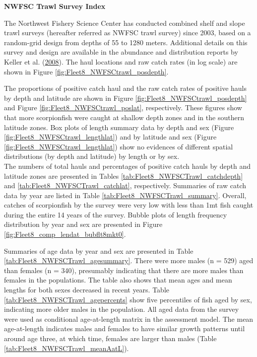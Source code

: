 \documentclass[12pt,]{article}
\begin{document}
\textbf{NWFSC Trawl Survey Index}

The Northwest Fishery Science Center has conducted combined shelf and
slope trawl surveys (hereafter referred as NWFSC trawl survey) since
2003, based on a random-grid design from depths of 55 to 1280 meters.
Additional details on this survey and design are available in the
abundance and distribution reports by Keller et al.
(\protect\hyperlink{ref-Keller2008}{2008}). The haul locations and raw
catch rates (in log scale) are shown in Figure
\ref{fig:Fleet8_NWFSCtrawl_posdepth}.

The proportions of positive catch haul and the raw catch rates of
positive hauls by depth and latitude are shown in Figure
\ref{fig:Fleet8_NWFSCtrawl_posdepth} and Figure
\ref{fig:Fleet8_NWFSCtrawl_poslat}, respectively. These figures show
that more scorpionfish were caught at shallow depth zones and in the
southern latitude zones. Box plots of length summary data by depth and
sex (Figure \ref{fig:Fleet8_NWFSCtrawl_lengthlat}) and by latitude and
sex (Figure \ref{fig:Fleet8_NWFSCtrawl_lengthlat}) show no evidences of
different spatial distributions (by depth and latitude) by length or by
sex.\\
The numbers of total hauls and percentages of positive catch hauls by
depth and latitude zones are presented in Tables
\ref{tab:Fleet8_NWFSCTrawl_catchdepth} and
\ref{tab:Fleet8_NWFSCTrawl_catchlat}, respectively. Summaries of raw
catch data by year are listed in Table
\ref{tab:Fleet8_NWFSCTrawl_summary}. Overall, catches of scorpionfish by
the survey were very low with less than 1mt fish caught during the
entire 14 years of the survey. Bubble plots of length frequency
distribution by year and sex are presented in Figure
\ref{fig:Fleet8_comp_lendat_bubflt8mkt0}.

Summaries of age data by year and sex are presented in Table
\ref{tab:Fleet8_NWFSCTrawl_agesummary}. There were more males (n = 529)
aged than females (n = 340), presumably indicating that there are more
males than females in the populations. The table also shows that mean
ages and mean lengths for both sexes decreased in recent years. Table
\ref{tab:Fleet8_NWFSCTrawl_agepercents} show five percentiles of fish
aged by sex, indicating more older males in the population. All aged
data from the survey were used as conditional age-at-length matrix in
the assessment model. The mean age-at-length indicates males and females
to have similar growth patterns until around age three, at which time,
females are larger than males (Table
\ref{tab:Fleet8_NWFSCTrawl_meanAatL}).
\end{document}

